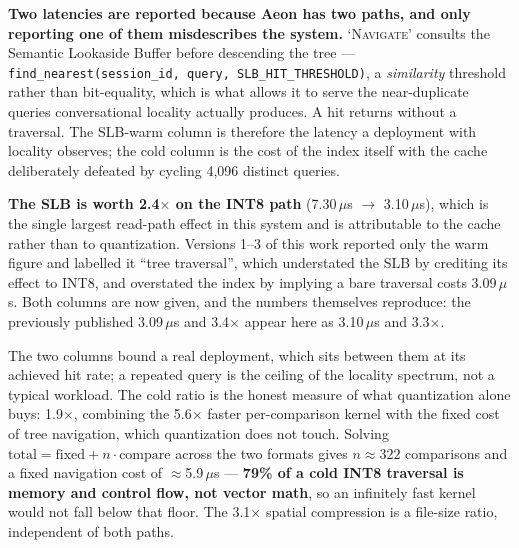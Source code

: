 \documentclass[10pt,twocolumn]{article}
\begin{document}
\begin{table}[!htbp]
\centering
\caption{Navigate latency at $N = 100{,}000$, on both read paths, with on-disk size.}
\label{tab:traversal}
\end{table}

\textbf{Two latencies are reported because Aeon has two paths, and only reporting one of them misdescribes the system.} `\textsc{Navigate}' consults the Semantic Lookaside Buffer before descending the tree --- \texttt{find\_nearest(session\_id, query, SLB\_HIT\_THRESHOLD)}, a \emph{similarity} threshold rather than bit-equality, which is what allows it to serve the near-duplicate queries conversational locality actually produces. A hit returns without a traversal. The SLB-warm column is therefore the latency a deployment with locality observes; the cold column is the cost of the index itself with the cache deliberately defeated by cycling 4{,}096 distinct queries.

\textbf{The SLB is worth 2.4$\times$ on the INT8 path} (7.30\,$\mu$s $\rightarrow$ 3.10\,$\mu$s), which is the single largest read-path effect in this system and is attributable to the cache rather than to quantization. Versions 1--3 of this work reported only the warm figure and labelled it ``tree traversal'', which understated the SLB by crediting its effect to INT8, and overstated the index by implying a bare traversal costs 3.09\,$\mu$s. Both columns are now given, and the numbers themselves reproduce: the previously published 3.09\,$\mu$s and 3.4$\times$ appear here as 3.10\,$\mu$s and 3.3$\times$.

The two columns bound a real deployment, which sits between them at its achieved hit rate; a repeated query is the ceiling of the locality spectrum, not a typical workload. The cold ratio is the honest measure of what quantization alone buys: 1.9$\times$, combining the 5.6$\times$ faster per-comparison kernel with the fixed cost of tree navigation, which quantization does not touch. Solving $\textrm{total} = \textrm{fixed} + n\cdot\textrm{compare}$ across the two formats gives $n \approx 322$ comparisons and a fixed navigation cost of $\approx$5.9\,$\mu$s --- \textbf{79\% of a cold INT8 traversal is memory and control flow, not vector math}, so an infinitely fast kernel would not fall below that floor. The 3.1$\times$ spatial compression is a file-size ratio, independent of both paths.
\end{document}
